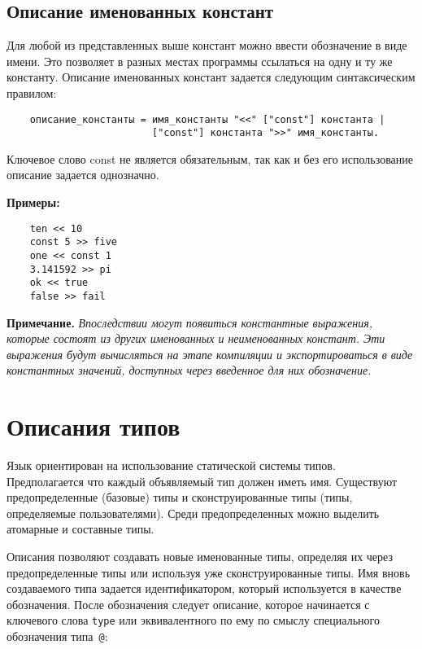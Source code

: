 {\subsection{Описание именованных констант}

Для любой из представленных выше констант можно ввести обозначение в виде имени. Это позволяет в разных местах программы ссылаться на одну и ту же константу. Описание именованных констант задается следующим синтаксическим правилом:

\begin{verbatim}
    описание_константы = имя_константы "<<" ["const"] константа |
                         ["const"] константа ">>" имя_константы.
\end{verbatim}

Ключевое слово const не является обязательным, так как и без его использование описание задается однозначно.

\textbf{Примеры:}

\begin{verbatim}
    ten << 10
    const 5 >> five
    one << const 1
    3.141592 >> pi
    ok << true
    false >> fail
\end{verbatim}

\textbf{Примечание.}
\textit{Впоследствии могут появиться константные выражения, которые состоят из других именованных и неименованных констант. Эти выражения будут вычисляться на этапе компиляции и экспортироваться в виде константных значений, доступных через введенное для них обозначение.}

\section{Описания типов}
\label{smile:type}

Язык ориентирован на использование статической системы типов. Предполагается что каждый объявляемый тип должен иметь имя. Существуют предопределенные (базовые) типы и сконструированные типы (типы, определяемые пользователями). Среди предопределенных можно выделить атомарные и составные типы.

Описания позволяют создавать новые именованные типы, определяя их через предопределенные типы или используя уже сконструированные типы. Имя вновь создаваемого типа задается идентификатором, который используется в качестве обозначения. После обозначения следует описание, которое начинается с ключевого слова \verb|type| или эквивалентного по ему по смыслу специального обозначения типа~\verb|@|:

}
